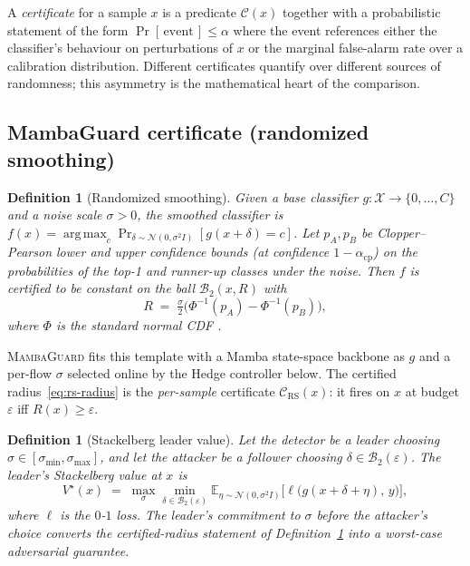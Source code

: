\documentclass[journal,twoside]{IEEEtran}
\newtheorem{definition}[theorem]{Definition}
\DeclareMathOperator*{\argmax}{arg\,max}
\begin{document}
A \emph{certificate} for a sample $x$ is a predicate $\mathcal{C}(x)$
together with a probabilistic statement of the form
$\Pr[\,\text{event}\,] \le \alpha$ where the event references either
the classifier's behaviour on perturbations of $x$ or the marginal
false-alarm rate over a calibration distribution. Different certificates
quantify over different sources of randomness; this asymmetry is the
mathematical heart of the comparison.

\subsection{MambaGuard certificate (randomized smoothing)}

\begin{definition}[Randomized smoothing]
\label{def:rs}
Given a base classifier $g : \mathcal{X} \to \{0,\dots,C\}$ and a noise
scale $\sigma > 0$, the \emph{smoothed classifier} is
$f(x) = \argmax_{c} \Pr_{\delta\sim\mathcal{N}(0,\sigma^2 I)}
[g(x+\delta) = c]$. Let $p_A, p_B$ be Clopper--Pearson lower and upper
confidence bounds (at confidence $1-\alpha_{\mathrm{cp}}$) on the
probabilities of the top-1 and runner-up classes under the noise. Then
$f$ is certified to be constant on the ball
$\mathcal{B}_2(x,R)$ with
\begin{equation}
\label{eq:rs-radius}
R \;=\; \tfrac{\sigma}{2}\bigl(\Phi^{-1}(p_A) - \Phi^{-1}(p_B)\bigr),
\end{equation}
where $\Phi$ is the standard normal CDF
\cite{cohen2019smoothing,salman2019adv}.
\end{definition}

\textsc{MambaGuard} fits this template with a Mamba state-space backbone
\cite{gu2024mamba} as $g$ and a per-flow $\sigma$ selected online by the
Hedge controller below. The certified radius~\eqref{eq:rs-radius} is
the \emph{per-sample} certificate $\mathcal{C}_{\mathrm{RS}}(x)$: it
fires on $x$ at budget $\varepsilon$ iff $R(x) \ge \varepsilon$.

\begin{definition}[Stackelberg leader value]
\label{def:stackelberg}
Let the detector be a leader choosing
$\sigma \in [\sigma_{\min},\sigma_{\max}]$, and let the attacker be a
follower choosing $\delta \in \mathcal{B}_2(\varepsilon)$. The leader's
Stackelberg value at $x$ is
\begin{equation}
V^\star(x) \;=\; \max_{\sigma} \min_{\delta \in \mathcal{B}_2(\varepsilon)}
\mathbb{E}_{\eta\sim\mathcal{N}(0,\sigma^2 I)}
\bigl[\ell\bigl(g(x+\delta+\eta),\,y\bigr)\bigr],
\end{equation}
where $\ell$ is the $0$-$1$ loss. The leader's commitment to $\sigma$
before the attacker's choice converts the certified-radius statement of
Definition~\ref{def:rs} into a worst-case adversarial guarantee.
\end{definition}
\end{document}
